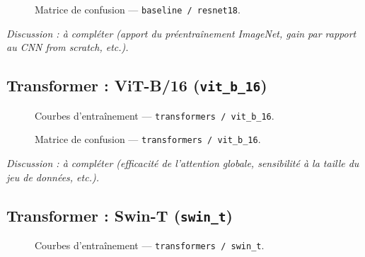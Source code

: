 \begin{figure}[H]
    \centering
    \caption{Matrice de confusion --- \texttt{baseline / resnet18}.}
    \label{fig:cm_baseline_resnet18}
\end{figure}


\textit{Discussion : à compléter (apport du préentraînement ImageNet,
gain par rapport au CNN \emph{from scratch}, etc.).}

\subsection{Transformer : ViT-B/16 (\texttt{vit\_b\_16})}
\label{subsec:transformers_vit_b_16}

\begin{figure}[H]
    \centering
    \caption{Courbes d'entraînement --- \texttt{transformers / vit\_b\_16}.}
    \label{fig:hist_transformers_vit_b_16}
\end{figure}

\begin{figure}[H]
    \centering
    \caption{Matrice de confusion --- \texttt{transformers / vit\_b\_16}.}
    \label{fig:cm_transformers_vit_b_16}
\end{figure}


\textit{Discussion : à compléter (efficacité de l'attention globale,
sensibilité à la taille du jeu de données, etc.).}

\subsection{Transformer : Swin-T (\texttt{swin\_t})}
\label{subsec:transformers_swin_t}

\begin{figure}[H]
    \centering
    \caption{Courbes d'entraînement --- \texttt{transformers / swin\_t}.}
    \label{fig:hist_transformers_swin_t}
\end{figure}

